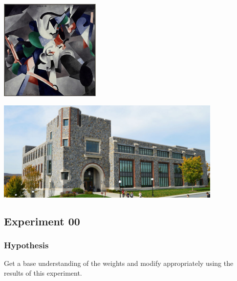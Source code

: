 \documentclass[12pt]{article}
\begin{document}
\begin{minipage}[c]{0.3\textwidth}
\includegraphics[height=50mm]{visuals/styles/udnie.jpg}
\end{minipage}
\begin{minipage}[c]{0.6\textwidth}
\includegraphics[height=50mm]{visuals/hancock.jpg}
\end{minipage}

\subsection{Experiment 00}
\subsubsection{Hypothesis} Get a base understanding of the weights and modify appropriately using the results of this experiment.
\end{document}
